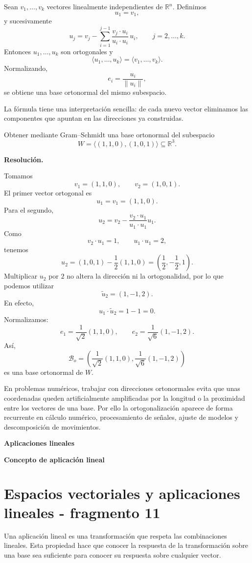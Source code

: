 \begin{theorem}
Sean $v_1,\ldots,v_k$ vectores linealmente independientes de $\mathbb{R}^n$. Definimos
\[
u_1=v_1,
\]
y sucesivamente
\[
u_j
=v_j-
\sum_{i=1}^{j-1}
\frac{v_j\cdot u_i}{u_i\cdot u_i}\,u_i,
\qquad j=2,\ldots,k.
\]
Entonces $u_1,\ldots,u_k$ son ortogonales y
\[
\langle u_1,\ldots,u_k\rangle
=
\langle v_1,\ldots,v_k\rangle.
\]
Normalizando,
\[
e_i=\frac{u_i}{\|u_i\|},
\]
se obtiene una base ortonormal del mismo subespacio.
\end{theorem}

La fórmula tiene una interpretación sencilla: de cada nuevo vector eliminamos las componentes que apuntan en las direcciones ya construidas.

\begin{solvedexercise}
Obtener mediante Gram--Schmidt una base ortonormal del subespacio
\[
W=\langle(1,1,0),(1,0,1)\rangle\subseteq\mathbb{R}^3.
\]

\textbf{Resolución.}\par\smallskip
Tomamos
\[
v_1=(1,1,0),
\qquad
v_2=(1,0,1).
\]
El primer vector ortogonal es
\[
u_1=v_1=(1,1,0).
\]
Para el segundo,
\[
u_2
=v_2-\frac{v_2\cdot u_1}{u_1\cdot u_1}u_1.
\]
Como
\[
v_2\cdot u_1=1,
\qquad
u_1\cdot u_1=2,
\]
tenemos
\[
u_2
=(1,0,1)-\frac12(1,1,0)
=\left(\frac12,-\frac12,1\right).
\]
Multiplicar $u_2$ por $2$ no altera la dirección ni la ortogonalidad, por lo que podemos utilizar
\[
\widetilde u_2=(1,-1,2).
\]
En efecto,
\[
u_1\cdot\widetilde u_2=1-1=0.
\]
Normalizamos:
\[
e_1=\frac{1}{\sqrt2}(1,1,0),
\qquad
 e_2=\frac{1}{\sqrt6}(1,-1,2).
\]
Así,
\[
\boxed{
\mathcal B_o=
\left(
\frac{1}{\sqrt2}(1,1,0),
\frac{1}{\sqrt6}(1,-1,2)
\right)
}
\]
es una base ortonormal de $W$.
\end{solvedexercise}

En problemas numéricos, trabajar con direcciones ortonormales evita que unas coordenadas queden artificialmente amplificadas por la longitud o la proximidad entre los vectores de una base. Por ello la ortogonalización aparece de forma recurrente en cálculo numérico, procesamiento de señales, ajuste de modelos y descomposición de movimientos.

\textbf{Aplicaciones lineales}

\textbf{Concepto de aplicación lineal}


\section{Espacios vectoriales y aplicaciones lineales - fragmento 11}
Una aplicación lineal es una transformación que respeta las combinaciones lineales. Esta propiedad hace que conocer la respuesta de la transformación sobre una base sea suficiente para conocer su respuesta sobre cualquier vector.

